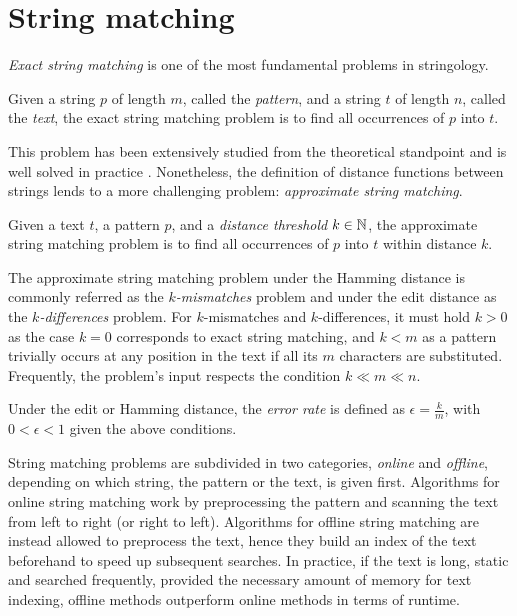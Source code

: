 \section{String matching}

\emph{Exact string matching} is one of the most fundamental problems in stringology.
\begin{definition}
\citep{Gusfield1997}
Given a string $p$ of length $m$, called the \emph{pattern}, and a string $t$ of length $n$, called the \emph{text}, the exact string matching problem is to find all occurrences of $p$ into $t$.
\end{definition}

This problem has been extensively studied from the theoretical standpoint and is well solved in practice \citep{Faro2013}.
Nonetheless, the definition of distance functions between strings lends to a more challenging problem: \emph{approximate string matching}.

\begin{definition}
\citep{Galil1988}
Given a text $t$, a pattern $p$, and a \emph{distance threshold} $k \in \mathbb {N}$, the approximate string matching problem is to find all occurrences of $p$ into $t$ within distance $k$.
\end{definition}
The approximate string matching problem under the Hamming distance is commonly referred as the \emph{$k$-mismatches} problem and under the edit distance as the \emph{$k$-differences} problem.
For $k$-mismatches and $k$-differences, it must hold $k > 0$ as the case $k = 0$ corresponds to exact string matching, and $k < m$ as a pattern trivially occurs at any position in the text if all its $m$ characters are substituted.
Frequently, the problem's input respects the condition $k \ll m \ll n$.
\begin{definition}
Under the edit or Hamming distance, the \emph{error rate} is defined as $\epsilon = \frac{k}{m}$, with $0 < \epsilon < 1$ given the above conditions.
\end{definition}

String matching problems are subdivided in two categories, \emph{online} and \emph{offline}, depending on which string, the pattern or the text, is given first.
Algorithms for online string matching work by preprocessing the pattern and scanning the text from left to right (or right to left).
Algorithms for offline string matching are instead allowed to preprocess the text,
hence they build an index of the text beforehand to speed up subsequent searches.
In practice, if the text is long, static and searched frequently, provided the necessary amount of memory for text indexing, offline methods outperform online methods in terms of runtime.

